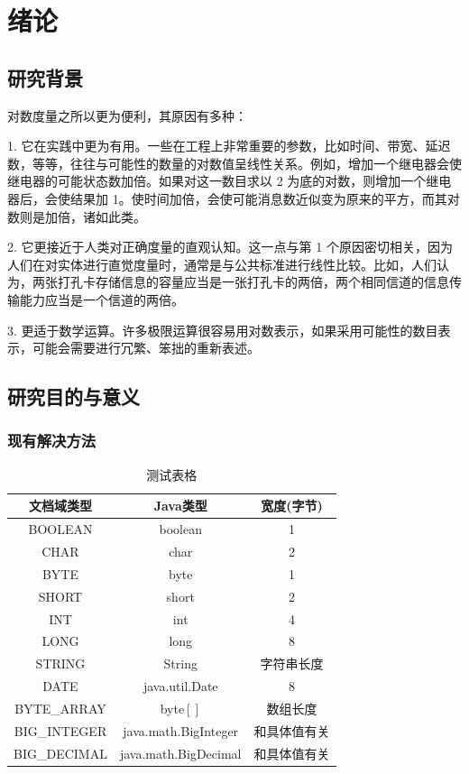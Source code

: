 \chapter{绪论}

\section{研究背景}

对数度量之所以更为便利，其原因有多种：

1. 它在实践中更为有用。一些在工程上非常重要的参数，比如时间、带宽、延迟数，等等，往往与可能性的数量的对数值呈线性关系。例如，增加一个继电器会使继电器的可能状态数加倍。如果对这一数目求以 2 为底的对数，则增加一个继电器后，会使结果加 1。使时间加倍，会使可能消息数近似变为原来的平方，而其对数则是加倍，诸如此类。

2. 它更接近于人类对正确度量的直观认知。这一点与第 1 个原因密切相关，因为人们在对实体进行直觉度量时，通常是与公共标准进行线性比较。比如，人们认为，两张打孔卡存储信息的容量应当是一张打孔卡的两倍，两个相同信道的信息传输能力应当是一个信道的两倍。

3. 更适于数学运算。许多极限运算很容易用对数表示，如果采用可能性的数目表示，可能会需要进行冗繁、笨拙的重新表述。

\section{研究目的与意义}
\subsection{现有解决方法}

\begin{table}
  \centering
  \begin{tabular}{ccc}
    \toprule
    \textbf{文档域类型} & \textbf{Java类型} & \textbf{宽度(字节)} \\
    \midrule
    BOOLEAN  & boolean &  1 \\
    CHAR     & char    &  2 \\
    BYTE     & byte    &  1 \\
    SHORT    & short   &  2 \\
    INT      & int     &  4 \\
    LONG     & long    &  8 \\
    STRING   & String  &  字符串长度 \\
    DATE     & java.util.Date & 8 \\
    BYTE\_ARRAY & byte$[]$ & 数组长度 \\
    BIG\_INTEGER & java.math.BigInteger & 和具体值有关 \\
    BIG\_DECIMAL & java.math.BigDecimal & 和具体值有关 \\
    \bottomrule
  \end{tabular}
  \caption{测试表格}\label{table:test1}
\end{table}


